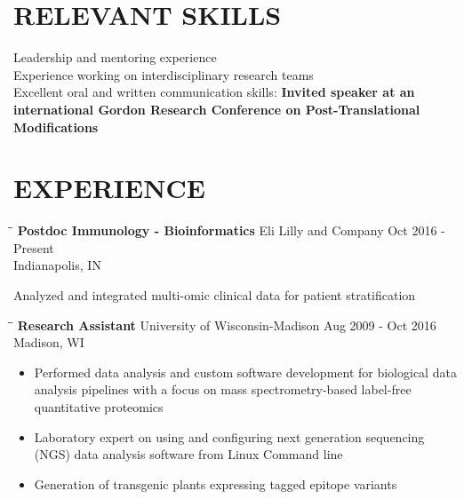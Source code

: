 \documentclass[line]{res}
\begin{document}
\begin{resume}
\section{RELEVANT SKILLS}
Leadership and mentoring experience \\
Experience working on interdisciplinary research teams \\
Excellent oral and written communication skills: \textbf{Invited speaker at an international Gordon Research Conference on Post-Translational Modifications}

\section{EXPERIENCE}
   \vspace{-0.1in}	
   \begin{tabbing}
   \hspace{2.55in}\= \hspace{2.30in}\= \kill %
    {\bf Postdoc Immunology - Bioinformatics} \>Eli Lilly and Company \> Oct 2016 - Present\\
                             \>Indianapolis, IN
   \end{tabbing}\vspace{-20pt}      %
   Analyzed and integrated multi-omic clinical data for patient stratification
   \vspace{-10pt}
   \begin{tabbing}
   \hspace{2.3in}\= \hspace{2.45in}\= \kill %
    {\bf Research Assistant} \>University of Wisconsin-Madison \> Aug 2009 - Oct 2016 \\
                          \>Madison, WI
   \end{tabbing}\vspace{-10pt}
   \begin{itemize}                     
     \item Performed data analysis and custom software development for biological data analysis pipelines with a focus on mass spectrometry-based label-free quantitative proteomics
     \item Laboratory expert on using and configuring next generation sequencing (NGS) data analysis software from Linux Command line
     \item Generation of transgenic plants expressing tagged epitope variants
   \end{itemize}
 
\end{resume}
\end{document}
